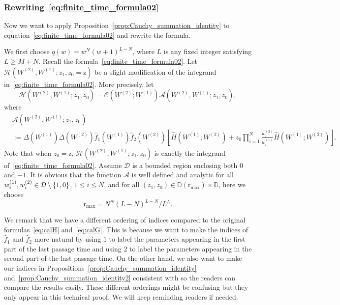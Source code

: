 \documentclass{article}
\numberwithin{equation}{section}
\newcommand{\Ch}{\mathcal{C}}
\newcommand{\rr}{\mathrm{r_{max}}}
\newcommand{\rz}{\mathrm{z}}
\begin{document}
\subsubsection{Rewriting~\eqref{eq:finite_time_formula02}}
\label{sec:rewriting_3_5}

Now we want to apply Proposition~\ref{prop:Cauchy_summation_identity} to equation~\eqref{eq:finite_time_formula02} and rewrite the formula.

We first choose $q(w)=w^N(w+1)^{L-N}$, where $L$ is any fixed integer satisfying $L\ge M+N$. Recall the formula~\eqref{eq:finite_time_formula02}. Let $\mathcal{H}\left(W^{(2)},W^{(1)};z_1,z_0=\rz\right)$ be a slight modification of the integrand in~\eqref{eq:finite_time_formula02}. More precisely, let
\begin{equation}
	\label{eq:calH2}
	\mathcal{H} \left(W^{(2)},W^{(1)};z_1,z_0\right)=\Ch\left(W^{(2)};W^{(1)}\right)\mathcal{A} \left(W^{(2)},W^{(1)};z_1,z_0\right),
\end{equation}
where
\begin{equation}
	\label{eq:calA2}
	\begin{split}
	&\mathcal{A} \left(W^{(2)},W^{(1)};z_1,z_0\right)\\
	&:=\Delta\left(W^{(1)}\right)\Delta\left(W^{(2)}\right)\hat f_1\left(W^{(1)}\right) \hat f_2\left(W^{(2)}\right)\left[\hat H\left(W^{(1)};W^{(2)}\right) +z_0\prod_{i=1}^N\frac{w_{i}^{(2)}}{w_i^{(1)}}\hat H\left(W^{(1)};W^{(2)}\right)\right].
	\end{split}
\end{equation}
Note that when $z_0=\rz$, $\mathcal{H}\left(W^{(2)},W^{(1)};z_1,z_0\right)$ is exactly the integrand of~\eqref{eq:finite_time_formula02}. Assume $\mathcal{D}$ is a bounded region enclosing both $0$ and $-1$. It is obvious that the function $\mathcal{A}$ is well defined and analytic for all $w_{i}^{(1)}, w_i^{(2)}\in \mathcal{D}\setminus\{\-1,0\}$, $1\le i\le N$, and for all $(z_1,z_0)\in \mathbb{D}(\rr)\times\mathbb{D}$, here we choose
\begin{equation}
	\label{eq:rr_value}
	\rr= N^N(L-N)^{L-N}/L^L.
\end{equation}

We remark that we have a different ordering of indices compared to the original formulas~\eqref{eq:calH} and~\eqref{eq:calG}. This is because we want to make the indices of $\hat f_1$ and $\hat f_2$ more natural by using $1$ to label the parameters appearing in the first part of the last passage time and using $2$ to label the parameters appearing in the second part of the last passage time. On the other hand, we also want to make our indices in Propositions~\ref{prop:Cauchy_summation_identity} and~\ref{prop:Cauchy_summation_identity2} consistent with \cite{Liu19} so the readers can compare the results easily. These different orderings might be confusing but they only appear in this technical proof. We will keep reminding readers if needed.
\end{document}
